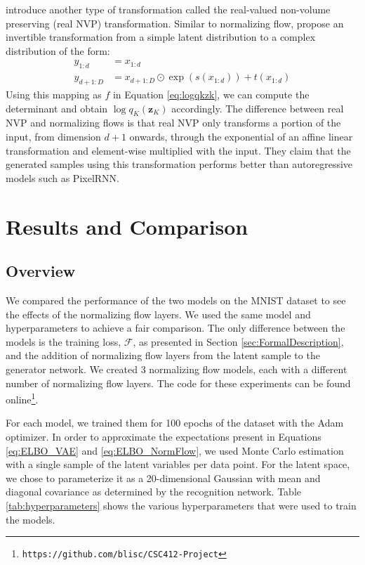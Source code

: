 \documentclass{article}
\newcommand{\bz}{\mathbf{z}}
\begin{document}
\citet{D16} introduce another type of transformation called the real-valued non-volume preserving (real NVP) 
transformation. Similar to normalizing flow, \citet{D16} propose an invertible transformation from a simple
latent distribution to a complex distribution of the form:
\begin{align}
	y_{1:d} &= x_{1:d} \\
	y_{d+1:D} &= x_{d+1:D} \odot \exp\left(s(x_{1:d})\right) + t\left(x_{1:d}\right)
\end{align}
Using this mapping as $f$ in Equation \ref{eq:logqkzk}, we can compute the determinant and 
obtain $\log q_K(\bz_K)$ accordingly. The difference between real NVP and normalizing flows is that 
real NVP only transforms a portion of the input, from dimension $d+1$ onwards, through the exponential 
of an affine linear transformation and element-wise multiplied with the input. They claim that the generated 
samples using this transformation performs better than autoregressive models such as PixelRNN.

\section{Results and Comparison}

\subsection{Overview}
We compared the performance of the two models on the MNIST dataset to see the effects of the normalizing
flow layers. We used the same model and hyperparameters to achieve a fair comparison. The only difference 
between the models is the training loss, $\mathcal{F}$, as presented in Section \ref{sec:FormalDescription}, 
and the addition of normalizing flow layers from the latent sample to the generator network. We created 3 
normalizing flow models, each with a different number of normalizing flow layers. The code for these experiments
can be found online\footnote{\texttt{https://github.com/blisc/CSC412-Project}}.

For each model, we trained them for 100 epochs of the dataset with the Adam optimizer. In order to approximate 
the expectations present in Equations \ref{eq:ELBO_VAE} and \ref{eq:ELBO_NormFlow}, we used Monte Carlo 
estimation with a single sample of the latent variables per data point. For the latent space, we chose to 
parameterize it as a 20-dimensional Gaussian with mean and diagonal covariance as determined by the 
recognition network. Table \ref{tab:hyperparameters} shows the various hyperparameters that were used to
train the models.
\end{document}
